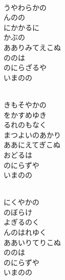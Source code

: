 \documentclass[10pt,b5j]{tarticle} %
\begin{document}
\vspace{1.5em} %
\newcommand{\linespace}{0.5em} %
\newcommand{\blocksize}{0.5\hsize} %
\newcommand{\itemmargin}{6em} %
\begin{enumerate} %
    \setlength{\itemindent}{\itemmargin} %
    \begin{minipage}[c]{\blocksize}
    
        \vspace{\linespace}
        \item~\\
        うやわらかの\\
        んのの\\
        にかかるに\\
        かぶの\\
        あありみてえこぬ\\
        ののは\\
        のにらざるや\\
        いまのの
        
        \vspace{\linespace}
        \item~\\
        きもそやかの\\
        をかすめゆき\\
        るれのもなく\\
        まつよいのあかり\\
        ああにえてぎこぬ\\
        おどるは\\
        のにらずや\\
        いまのの
        
        \vspace{\linespace}
        \item~\\
        にくやかの\\
        のぼらけ\\
        よぎるのく\\
        んのはれゆく\\
        ああいりてりこぬ\\
        ののは\\
        のにらずや\\
        いまのの
        

\end{minipage}
\end{enumerate}
\end{document}
